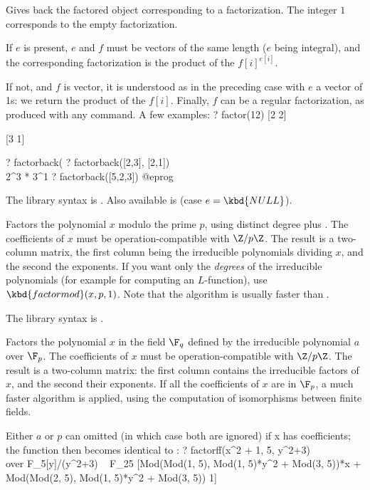 \label{se:factorback}
Gives back the factored object
corresponding to a factorization. The integer $1$ corresponds to the empty
factorization.

If $e$ is present, $e$ and $f$ must be vectors of the same length ($e$ being
integral), and the corresponding factorization is the product of the
$f[i]^{e[i]}$.

If not, and $f$ is vector, it is understood as in the preceding case with $e$
a vector of 1s: we return the product of the $f[i]$. Finally, $f$ can be a
regular factorization, as produced with any  command. A few
examples:
\bprog
? factor(12)
[2 2]

[3 1]

? factorback(%
? factorback([2,3], [2,1])   \\ 2^3 * 3^1
? factorback([5,2,3])
@eprog

The library syntax is .
Also available is  (case $e = \kbd{NULL}$).

\label{se:factorcantor}
Factors the polynomial $x$ modulo the
prime $p$, using distinct degree plus
. The coefficients of $x$ must be
operation-compatible with $\Z/p\Z$. The result is a two-column matrix, the
first column being the irreducible polynomials dividing $x$, and the second
the exponents. If you want only the \emph{degrees} of the irreducible
polynomials (for example for computing an $L$-function), use
$\kbd{factormod}(x,p,1)$. Note that the  algorithm is
usually faster than .

The library syntax is .

\label{se:factorff}
Factors the polynomial $x$ in the field
$\F_q$ defined by the irreducible polynomial $a$ over $\F_p$. The
coefficients of $x$ must be operation-compatible with $\Z/p\Z$. The result
is a two-column matrix: the first column contains the irreducible factors of
$x$, and the second their exponents. If all the coefficients of $x$ are in
$\F_p$, a much faster algorithm is applied, using the computation of
isomorphisms between finite fields.

Either $a$ or $p$ can omitted (in which case both are ignored) if x has
 coefficients; the function then becomes identical to :
\bprog
? factorff(x^2 + 1, 5, y^2+3)  \\ over F_5[y]/(y^2+3) ~ F_25
[Mod(Mod(1, 5), Mod(1, 5)*y^2 + Mod(3, 5))*x
 + Mod(Mod(2, 5), Mod(1, 5)*y^2 + Mod(3, 5)) 1]

